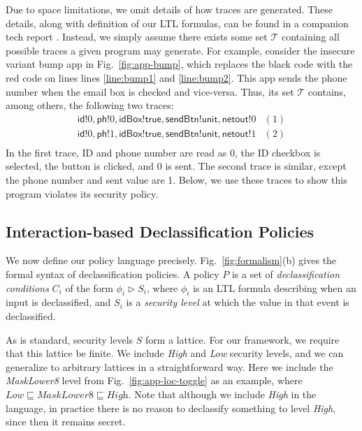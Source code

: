 \documentclass{llncs}
\newcommand{\code}[1]{\textsf{#1}} %
\newcommand{\tset}{\ensuremath{\mathcal{T}}\xspace}
\begin{document}
Due to space limitations, we omit details of how traces are
generated.  These details, along with definition of our LTL 
formulas, can be found in a companion tech report \cite{Micinski:2015}.
Instead, we simply assume there exists some set
$\tset$ containing all possible traces a given program may
generate.
For example, consider the insecure variant bump app in
Fig.~\ref{fig:app-bump}, which replaces the black code with the red
code on lines lines \ref{line:bump1}
and \ref{line:bump2}.  This app sends the phone number when the
email box is checked and vice-versa. Thus, its set $\tset$
contains, among others, the following two traces:
\begin{displaymath}
  \begin{array}{cl}
    \code{id}!0, \code{ph}!0, \code{idBox}!\code{true},
    \code{sendBtn}!\code{unit}, \code{netout}!0 & (1) \\
    \code{id}!0, \code{ph}!1, \code{idBox}!\code{true},
    \code{sendBtn}!\code{unit}, \code{netout}!1 & (2) \\
  \end{array}
\end{displaymath}%
\lstset{language=Java}%
In the first trace, ID and phone number are read as 0, the
ID checkbox is selected, the button is clicked, and 0 is sent.
The second trace is similar, except the phone number and sent value
are 1. Below, we use these traces to show this program
violates its security policy.

\subsection{Interaction-based Declassification Policies}
\label{sec:policies}

We now define our policy language precisely.
Fig.~\ref{fig:formalism}(b) gives the formal syntax of
declassification policies.  A policy $P$ is a set of
\emph{declassification conditions} $C_i$ of the form $\phi_i\rhd S_i$,
where $\phi_i$ is an LTL formula describing when an input is
declassified, and $S_i$ is a \emph{security level} at which the value
in that event is declassified.

As is standard, security levels $S$ form a lattice.  For our
framework, we require that this lattice be finite.  We include
\textit{High} and \textit{Low} security levels, and we can generalize
to arbitrary lattices in a straightforward way. Here we include the
\textit{MaskLower8} level from Fig.~\ref{fig:app-loc-toggle} as an
example, where $\textit{Low} \sqsubseteq \textit{MaskLower8}
\sqsubseteq \textit{High}$.  Note that although we include
\textit{High} in the language, in practice there is no reason to
declassify something to level \textit{High}, since then it remains
secret.
\end{document}
